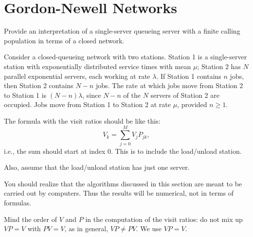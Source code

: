 
\section{Gordon-Newell Networks}
\label{sec:gordonNewell}





\begin{exercise}
 Provide an interpretation of a single-server queueing server with a
 finite calling population in terms of a closed network.
\begin{solution}
 Consider a closed-queueing network with two stations.
 Station 1 is a single-server station with exponentially distributed service times with mean $\mu$; Station 2 has $N$ parallel exponential servers, each working at rate $\lambda$.
 If Station 1 contains $n$ jobs, then Station 2 contains $N-n$ jobs.
 The rate at which jobs move from Station 2 to Station 1 is $(N-n)\lambda$, since $N-n$ of the $N$ servers of Station 2 are occupied.
 Jobs move from Station 1 to Station 2 at rate $\mu$, provided $n\geq1$.
\end{solution}
\end{exercise}

The formula with the visit ratios should be like this:
\begin{equation*}
 V_k = \sum_{j=0}^M V_j P_{jk}, 
\end{equation*}
i.e., the sum should start at index 0. This is to include the
load/unload station.

Also, assume that the load/unload station has just one server.


You should realize that the algorithms discussed in this section are
meant to be carried out by computers. Thus the results will be
numerical, not in terms of formulas.

Mind the order of $V$ and $P$ in the computation of the visit ratios:
do not mix up $VP=V$ with $P V=V$, as in general, $VP \neq P V$. We use
$VP=V$.


